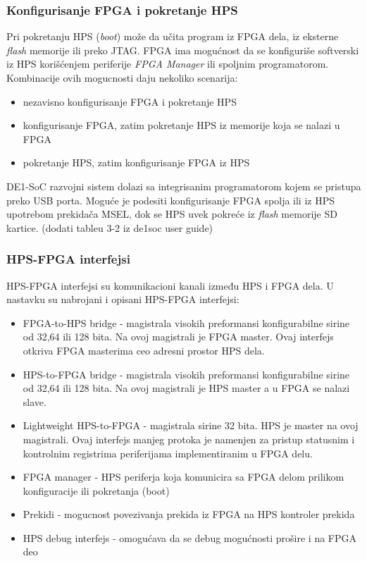 \subsubsection{Konfigurisanje FPGA i pokretanje HPS}
Pri pokretanju HPS (\textit{boot}) može da učita program iz FPGA dela, iz eksterne \textit{flash} memorije ili preko JTAG. FPGA ima mogućnost da se konfiguriše softverski iz HPS korišćenjem periferije \textit{FPGA Manager} ili spoljnim programatorom. Kombinacije ovih mogucnosti daju nekoliko scenarija:
\begin{itemize}
\item nezavisno konfigurisanje FPGA i pokretanje HPS
\item konfigurisanje FPGA, zatim pokretanje HPS iz memorije koja se nalazi u FPGA
\item pokretanje HPS, zatim konfigurisanje FPGA iz HPS
\end{itemize}
DE1-SoC razvojni sistem dolazi sa integrisanim programatorom kojem se pristupa preko USB porta. Moguće je podesiti konfigurisanje FPGA spolja ili iz HPS upotrebom prekidača MSEL, dok se HPS uvek pokreće iz \textit{flash} memorije SD kartice.
(dodati tableu 3-2 iz de1soc user guide)

\subsubsection{HPS-FPGA interfejsi}
HPS-FPGA interfejsi su komunikacioni kanali između HPS i FPGA dela. U nastavku su nabrojani i opisani HPS-FPGA interfejsi:
\begin{itemize}
\item  FPGA-to-HPS bridge - magistrala visokih preformansi konfigurabilne sirine od 32,64 ili 128 bita. Na ovoj magistrali je FPGA master. Ovaj interfejs otkriva FPGA masterima ceo adresni prostor HPS dela.
\item HPS-to-FPGA bridge - magistrala visokih preformansi konfigurabilne sirine od 32,64 ili 128 bita. Na ovoj magistrali je HPS master a u FPGA se nalazi slave.
\item Lightweight HPS-to-FPGA - magistrala sirine 32 bita. HPS je master na ovoj magistrali. Ovaj interfejs manjeg protoka je namenjen za pristup statusnim i kontrolnim registrima periferijama implementiranim u FPGA delu.
\item FPGA manager - HPS periferja koja komunicira sa FPGA delom prilikom konfiguracije ili pokretanja (boot)
\item Prekidi - mogucnost povezivanja prekida iz FPGA na HPS kontroler prekida
\item HPS debug interfejs - omogućava da se debug mogućnosti prošire i na FPGA deo
\end{itemize}

